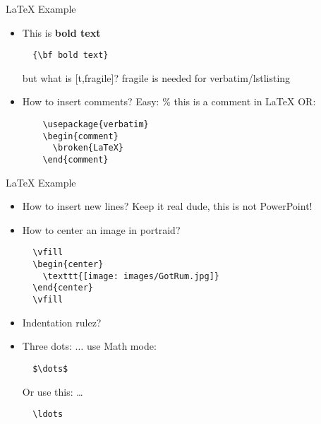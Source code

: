 
\begin{frame}[t,plain]
  \titlepage
\end{frame}

\begin{frame}[t,fragile]{LaTeX Example}
\begin{itemize}
  \item This is {\bf bold text}
  \begin{lstlisting}
  {\bf bold text}
  \end{lstlisting}
but what is [t,fragile]?
fragile is needed for verbatim/lstlisting
  \item How to insert comments?
  Easy: \% this is a comment in LaTeX
  OR:
  \begin{lstlisting}
    \usepackage{verbatim}
    \begin{comment}
      \broken{LaTeX}
    \end{comment}
  \end{lstlisting}
  \end{itemize}
\end{frame}

\begin{frame}[t,fragile]{LaTeX Example}
\begin{itemize}
  \item How to insert new lines?
  Keep it real dude, this is not PowerPoint!
  \item How to center an image in portraid?
  \begin{lstlisting}
  \vfill
  \begin{center}
    \texttt{[image: images/GotRum.jpg]}
  \end{center}
  \vfill
  \end{lstlisting}
  \item Indentation rulez?
  \item Three dots: $\dots$
  use Math mode:
  \begin{lstlisting}
  $\dots$
  \end{lstlisting}
  Or use this: \ldots
  \begin{lstlisting}
  \ldots
  \end{lstlisting}
\end{itemize}
\end{frame}

